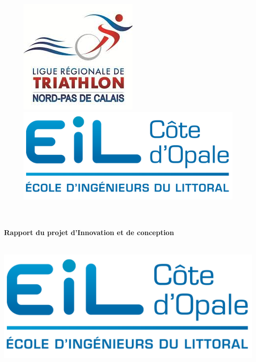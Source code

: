 \begin{titlepage}
  \begin{sffamily}
  \begin{center}
\begin{figure}
\includegraphics[scale=0.8]{logo_png.png} \hfill
\includegraphics[scale=0.7]{eilco.png} 
\end{figure}

    \textsc{\Large }\\[1.5cm]

    \HRule \\[0.4cm]
    { \huge \bfseries Rapport du projet d'Innovation et de conception\\[0.4cm] }

    \HRule \\[2cm]
    \includegraphics[scale=1]{logo.png}
    \\[2cm]


\end{center}
\end{sffamily}
\end{titlepage}
